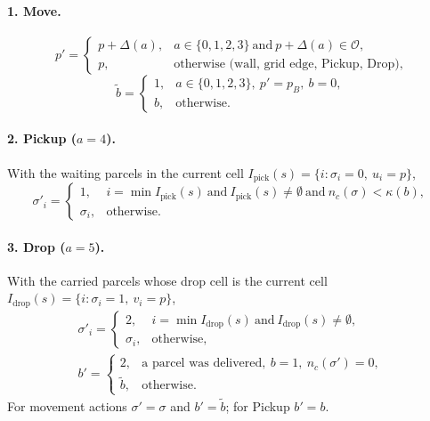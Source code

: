 \documentclass[11pt]{article}
\newcommand{\Open}{\mathcal{O}}
\begin{document}
\paragraph{1. Move.}
\begin{equation}
p'=\begin{cases}p+\Delta(a), & a\in\{0,1,2,3\}\ \text{and}\ p+\Delta(a)\in\Open,\\ p, & \text{otherwise (wall, grid edge, Pickup, Drop)},\end{cases}
\end{equation}
\begin{equation}
\tilde b=\begin{cases}1, & a\in\{0,1,2,3\},\ p'=p_B,\ b=0,\\ b, & \text{otherwise}.\end{cases}
\end{equation}

\paragraph{2. Pickup ($a=4$).} With the waiting parcels in the current cell $I_{\mathrm{pick}}(s)=\{i:\sigma_i=0,\ u_i=p\}$,
\begin{equation}
\sigma'_i=\begin{cases}1, & i=\min I_{\mathrm{pick}}(s)\ \text{and}\ I_{\mathrm{pick}}(s)\neq\emptyset\ \text{and}\ n_c(\sigma)<\kappa(b),\\ \sigma_i, & \text{otherwise}.\end{cases}
\end{equation}

\paragraph{3. Drop ($a=5$).} With the carried parcels whose drop cell is the current cell $I_{\mathrm{drop}}(s)=\{i:\sigma_i=1,\ v_i=p\}$,
\begin{equation}
\begin{gathered}
\sigma'_i=\begin{cases}2, & i=\min I_{\mathrm{drop}}(s)\ \text{and}\ I_{\mathrm{drop}}(s)\neq\emptyset,\\ \sigma_i, & \text{otherwise},\end{cases}
\\[4pt]
b'=\begin{cases}2, & \text{a parcel was delivered},\ b=1,\ n_c(\sigma')=0,\\ \tilde b, & \text{otherwise}.\end{cases}
\end{gathered}
\end{equation}
For movement actions $\sigma'=\sigma$ and $b'=\tilde b$; for Pickup $b'=b$.
\end{document}
